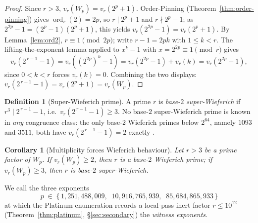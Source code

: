 \documentclass[11pt]{amsart}
\theoremstyle{plain}
\newtheorem{corollary}[theorem]{Corollary}
\theoremstyle{definition}
\newtheorem{definition}[theorem]{Definition}
\theoremstyle{remark}
\numberwithin{equation}{section}
\newcommand{\ord}{\operatorname{ord}}
\begin{document}
\begin{proof}
Since $r > 3$, $v_r(W_p) = v_r(2^p + 1)$. Order-Pinning (Theorem~\ref{thm:order-pinning}) gives $\ord_r(2) = 2p$, so $r \mid 2^p + 1$ and $r \nmid 2^p - 1$; as $2^{2p} - 1 = (2^p - 1)(2^p + 1)$, this yields $v_r(2^{2p} - 1) = v_r(2^p + 1)$. By Lemma~\ref{lem:ord2}, $r \equiv 1 \pmod{2p}$; write $r - 1 = 2 p k$ with $1 \leq k < r$. The lifting-the-exponent lemma applied to $x^k - 1$ with $x = 2^{2p} \equiv 1 \pmod r$ gives
\[
  v_r\!\left(2^{\,r-1} - 1\right) = v_r\!\left((2^{2p})^k - 1\right) = v_r(2^{2p} - 1) + v_r(k) = v_r(2^{2p} - 1),
\]
since $0 < k < r$ forces $v_r(k) = 0$. Combining the two displays: $v_r(2^{\,r-1} - 1) = v_r(2^p + 1) = v_r(W_p)$.
\end{proof}

\begin{definition}[Super-Wieferich prime]\label{def:super-wieferich}
A prime $r$ is \emph{base-$2$ super-Wieferich} if $r^3 \mid 2^{\,r-1} - 1$, i.e.\ $v_r(2^{\,r-1} - 1) \geq 3$. No base-$2$ super-Wieferich prime is known in \emph{any} congruence class: the only base-$2$ Wieferich primes below $2^{64}$, namely $1093$ and $3511$, both have $v_r(2^{\,r-1} - 1) = 2$ exactly \cite{ref:OEISWieferich}.
\end{definition}

\begin{corollary}[Multiplicity forces Wieferich behaviour]\label{cor:multiplicity-wieferich}
Let $r > 3$ be a prime factor of $W_p$. If $v_r(W_p) \geq 2$, then $r$ is a base-$2$ Wieferich prime; if $v_r(W_p) \geq 3$, then $r$ is base-$2$ super-Wieferich.
\end{corollary}

We call the three exponents
\[
  p \;\in\; \{\,1{,}251{,}488{,}009,\;\; 10{,}916{,}765{,}939,\;\; 85{,}684{,}865{,}933\,\}
\]
at which the Platinum enumeration records a local-pass inert factor $r \leq 10^{12}$ (Theorem~\ref{thm:platinum}, \S\ref{sec:secondary}) the \emph{witness exponents}.
\end{document}
